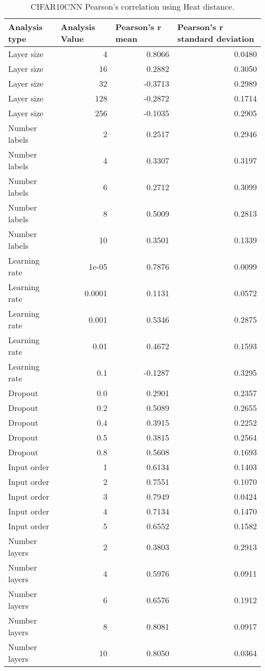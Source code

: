 \documentclass{article}
\begin{document}
\begin{table}[H]
\centering
\begin{tabular}{@{}lrrr@{}}
\toprule
Analysis type & \multicolumn{1}{l}{Analysis Value} & \multicolumn{1}{l}{Pearson's r mean} & \multicolumn{1}{l}{Pearson's r standard deviation} \\ \midrule
Layer size & 4 & 0.8066 & 0.0480 \\ 
Layer size & 16 & 0.2882 & 0.3050 \\ 
Layer size & 32 & -0.3713 & 0.2989 \\ 
Layer size & 128 & -0.2872 & 0.1714 \\ 
Layer size & 256 & -0.1035 & 0.2905 \\ 
Number labels & 2 & 0.2517 & 0.2946 \\ 
Number labels & 4 & 0.3307 & 0.3197 \\ 
Number labels & 6 & 0.2712 & 0.3099 \\ 
Number labels & 8 & 0.5009 & 0.2813 \\ 
Number labels & 10 & 0.3501 & 0.1339 \\ 
Learning rate & 1e-05 & 0.7876 & 0.0099 \\ 
Learning rate & 0.0001 & 0.1131 & 0.0572 \\ 
Learning rate & 0.001 & 0.5346 & 0.2875 \\ 
Learning rate & 0.01 & 0.4672 & 0.1593 \\ 
Learning rate & 0.1 & -0.1287 & 0.3295 \\ 
Dropout & 0.0 & 0.2901 & 0.2357 \\ 
Dropout & 0.2 & 0.5089 & 0.2655 \\ 
Dropout & 0.4 & 0.3915 & 0.2252 \\ 
Dropout & 0.5 & 0.3815 & 0.2564 \\ 
Dropout & 0.8 & 0.5608 & 0.1693 \\ 
Input order & 1 & 0.6134 & 0.1403 \\ 
Input order & 2 & 0.7551 & 0.1070 \\ 
Input order & 3 & 0.7949 & 0.0424 \\ 
Input order & 4 & 0.7134 & 0.1470 \\ 
Input order & 5 & 0.6552 & 0.1582 \\ 
Number layers & 2 & 0.3803 & 0.2913 \\ 
Number layers & 4 & 0.5976 & 0.0911 \\ 
Number layers & 6 & 0.6576 & 0.1912 \\ 
Number layers & 8 & 0.8081 & 0.0917 \\ 
Number layers & 10 & 0.8050 & 0.0364 \\ 
\bottomrule
\end{tabular}
\caption{CIFAR10CNN Pearson's correlation using Heat distance.}
\end{table}
\end{document}
